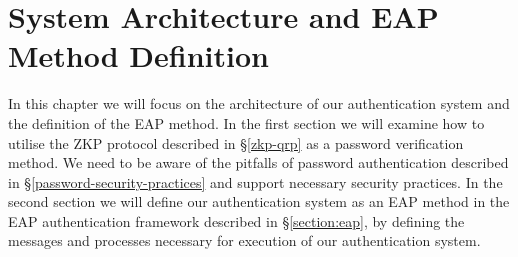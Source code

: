 \chapter{System Architecture and EAP Method Definition}
\label{chapter:3}

\noindent 
In this chapter we will focus on the architecture of our authentication system and the definition of the EAP method.
In the first section we will examine how to utilise the ZKP protocol described in \S\ref{zkp-qrp} as a password verification method.
We need to be aware of the pitfalls 	of password authentication described in \S\ref{password-security-practices} and support necessary security practices.
In the second section we will define our authentication system as an EAP method in the EAP authentication framework described in \S\ref{section:eap}, by defining the messages and processes necessary for execution of our authentication system.
